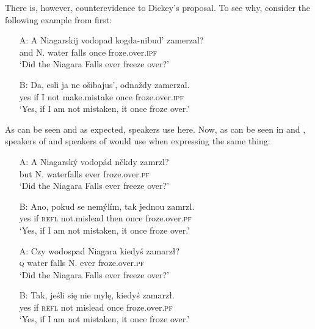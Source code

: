 \documentclass[output=paper,modfonts,newtxmath,hidelinks]{langscibook}
\begin{document}
There is, however, counterevidence to Dickey's proposal. To see why, consider the following example from  first:


\begin{exe}
\ex\label{13:lakeru}
\begin{itemize}
 \item[A:] \gll A Niagarskij vodopad kogda-nibud' zamerzal?\\
and N. {water falls} once froze.over.\textsc{ipf}\\
\glt `Did the Niagara Falls ever freeze over?'\vspace{0.2cm}
\item[B:] \gll Da, esli ja ne o\v{s}ibajus',  odna\v{z}dy zamerzal. \\
yes if I not make.mistake once froze.over.\textsc{ipf} \\
\glt `Yes, if I am not mistaken, it once froze over.'
\end{itemize}
\end{exe}

\noindent As can be seen and as expected,  speakers use  here. Now, as can be seen in  and , speakers of  and speakers of 
 would use  when expressing the same thing:

\begin{exe}
\ex\label{13:lake}
\begin{itemize}
 \item[A:] \gll A Niagarsk\'y vodop\'ad n\v{e}kdy zamrzl?\\
but N. waterfalls ever froze.over.\textsc{pf}\\
\glt `Did the Niagara Falls ever freeze over?'\vspace{0.2cm}
\item[B:] \gll Ano, pokud se nem\'yl\'im, tak jednou zamrzl. \\
yes if \textsc{refl} not.mislead then once froze.over.\textsc{pf} \\
\glt `Yes, if I am not mistaken, it once froze over.'
\end{itemize}
\end{exe}

\begin{exe}
\ex\label{13:lakepo}
\begin{itemize}
 \item[A:] \gll Czy wodospad Niagara kiedy\'s zamarz\l{?}\\
\textsc{q} {water falls} N. ever froze.over.\textsc{pf}\\
\glt `Did the Niagara Falls ever freeze over?'\vspace{0.2cm}
\item[B:] \gll Tak, je\'sli si\k e nie myl\k e, kiedy\'s zamarz\l{.} \\
yes if \textsc{refl} not mislead once froze.over.\textsc{pf} \\
\glt `Yes, if I am not mistaken, it once froze over.'
\end{itemize}
\end{exe}
\end{document}

